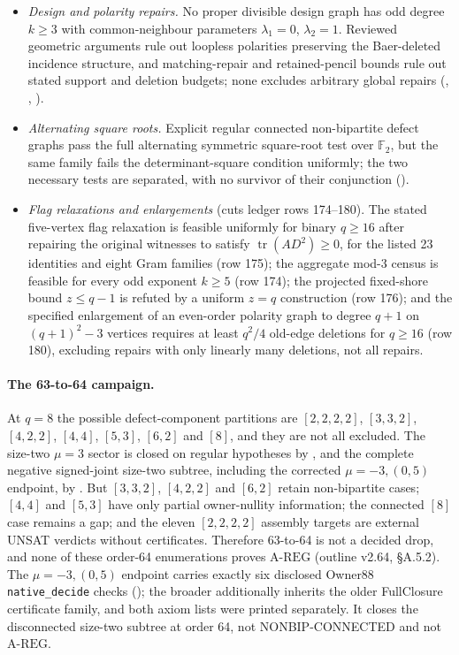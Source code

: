 \documentclass{anvil-paper}
\newcommand{\AREG}{\mathrm{A\text{-}REG}}
\theoremstyle{definition}
\begin{document}
\begin{itemize}
\item \emph{Design and polarity repairs.} No proper divisible design graph has odd degree $k\ge 3$ with common-neighbour parameters $\lambda_1=0$, $\lambda_2=1$. Reviewed geometric arguments rule out loopless polarities preserving the Baer-deleted incidence structure, and matching-repair and retained-pencil bounds rule out stated support and deletion budgets; none excludes arbitrary global repairs (, , ).
\item \emph{Alternating square roots.} Explicit regular connected non-bipartite defect graphs pass the full alternating symmetric square-root test over $\mathbb{F}_2$, but the same family fails the determinant-square condition uniformly; the two necessary tests are separated, with no survivor of their conjunction ().
\item \emph{Flag relaxations and enlargements} (cuts ledger rows 174--180). The stated five-vertex flag relaxation is feasible uniformly for binary $q\ge 16$ after repairing the original witnesses to satisfy $\operatorname{tr}(AD^2)\ge 0$, for the listed 23 identities and eight Gram families (row 175); the aggregate mod-3 census is feasible for every odd exponent $k\ge 5$ (row 174); the projected fixed-shore bound $z\le q-1$ is refuted by a uniform $z=q$ construction (row 176); and the specified enlargement of an even-order polarity graph to degree $q+1$ on $(q+1)^2-3$ vertices requires at least $q^2/4$ old-edge deletions for $q\ge 16$ (row 180), excluding repairs with only linearly many deletions, not all repairs.
\end{itemize}

\paragraph{The 63-to-64 campaign.} At $q=8$ the possible defect-component partitions are $[2,2,2,2]$, $[3,3,2]$, $[4,2,2]$, $[4,4]$, $[5,3]$, $[6,2]$ and $[8]$, and they are not all excluded. The size-two $\mu=3$ sector is closed on regular hypotheses by , and the complete negative signed-joint size-two subtree, including the corrected $\mu=-3,(0,5)$ endpoint, by . But $[3,3,2]$, $[4,2,2]$ and $[6,2]$ retain non-bipartite cases; $[4,4]$ and $[5,3]$ have only partial owner-nullity information; the connected $[8]$ case remains a gap; and the eleven $[2,2,2,2]$ assembly targets are external UNSAT verdicts without certificates. Therefore 63-to-64 is not a decided drop, and none of these order-64 enumerations proves $\AREG$ (outline v2.64, \S A.5.2). The $\mu=-3,(0,5)$ endpoint carries exactly six disclosed Owner88 \texttt{native\_decide} checks (); the broader  additionally inherits the older FullClosure certificate family, and both axiom lists were printed separately. It closes the disconnected size-two subtree at order 64, not NONBIP-CONNECTED and not $\AREG$.
\end{document}
